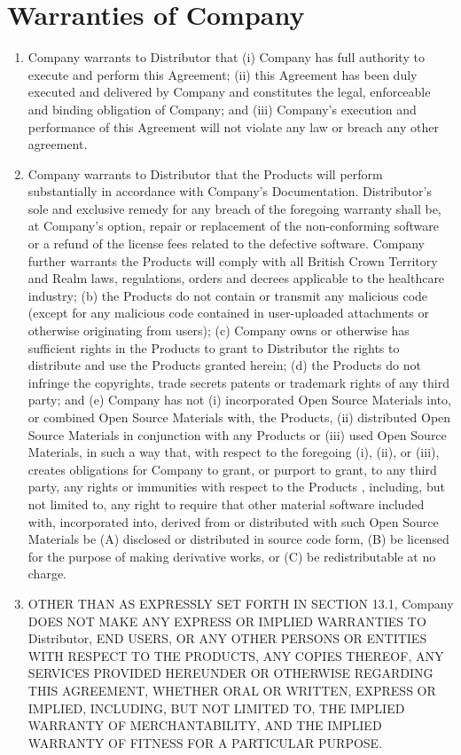 \documentclass[letterpaper,10pt,english]{sphinxmanual}
\begin{document}
\section{Warranties of Company}
\label{\detokenize{warranties:warranties-of-company}}\begin{enumerate}
\item {} 
Company warrants to Distributor that (i) Company has full authority to execute and perform this Agreement; (ii) this Agreement has been duly executed and delivered by Company and constitutes the legal, enforceable and binding obligation of Company; and (iii) Company’s execution and performance of this Agreement will not violate any law or breach any other agreement.

\item {} 
Company warrants to Distributor that the Products will perform substantially in accordance with Company’s Documentation.  Distributor’s sole and exclusive remedy for any breach of the foregoing warranty shall be, at Company’s option, repair or replacement of the non-conforming software or a refund of the license fees related to the defective software.  Company further warrants  the Products will  comply with all British Crown Territory and Realm laws, regulations, orders and decrees applicable to the healthcare industry; (b)  the Products do not contain or transmit any malicious code (except for any malicious code contained in user-uploaded attachments or otherwise originating from users); (c) Company owns or otherwise has sufficient rights in the Products to grant to Distributor the rights to distribute and use the Products granted herein; (d) the Products do not infringe the copyrights, trade secrets patents or trademark rights of any third party; and (e) Company has not (i) incorporated Open Source Materials into, or combined Open Source Materials with, the Products, (ii) distributed Open Source Materials in conjunction with any Products or (iii) used Open Source Materials, in such a way that, with respect to the foregoing (i), (ii), or (iii), creates obligations for  Company to grant, or purport to grant, to any third party, any rights or immunities with respect to the Products , including, but not limited to, any right to require that other material software included with, incorporated into, derived from or distributed with such Open Source Materials be (A) disclosed or distributed in source code form, (B) be licensed for the purpose of making derivative works, or (C) be redistributable at no charge.

\item {} 
OTHER THAN AS EXPRESSLY SET FORTH IN SECTION 13.1, Company DOES NOT MAKE ANY EXPRESS OR IMPLIED WARRANTIES TO Distributor, END USERS, OR ANY OTHER PERSONS OR ENTITIES WITH RESPECT TO THE PRODUCTS, ANY COPIES THEREOF, ANY SERVICES PROVIDED HEREUNDER OR OTHERWISE REGARDING THIS AGREEMENT, WHETHER ORAL OR WRITTEN, EXPRESS OR IMPLIED, INCLUDING, BUT NOT LIMITED TO, THE IMPLIED WARRANTY OF MERCHANTABILITY, AND THE IMPLIED WARRANTY OF FITNESS FOR A PARTICULAR PURPOSE.

\end{enumerate}
\end{document}
